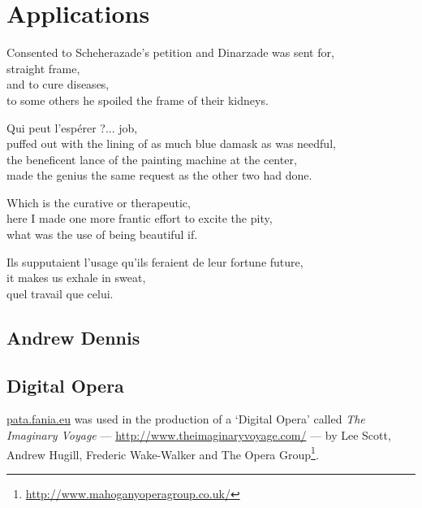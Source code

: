 
\chapter{Applications}
\label{ch:applications}

\startcontents[chapters]

\vfill

Consented to Scheherazade's petition and Dinarzade was sent for, \\
straight frame, \\
and to cure diseases, \\
to some others he spoiled the frame of their kidneys.

Qui peut l'espérer ?... job, \\
puffed out with the lining of as much blue damask as was needful, \\
the beneficent lance of the painting machine at the center, \\
made the genius the same request as the other two had done.

Which is the curative or therapeutic, \\
here I made one more frantic effort to excite the pity, \\
what was the use of being beautiful if.

Ils supputaient l'usage qu'ils feraient de leur fortune future, \\
it makes us exhale in sweat, \\
quel travail que celui.

\newpage
\minicontents
\spirals



\section{Andrew Dennis}




\section{Digital Opera}

\url{pata.fania.eu} was used in the production of a `Digital Opera' called \emph{The Imaginary Voyage} --- \url{http://www.theimaginaryvoyage.com/} --- by Lee Scott, Andrew Hugill, Frederic Wake-Walker and The Opera Group\footnote{\url{http://www.mahoganyoperagroup.co.uk/}}.

